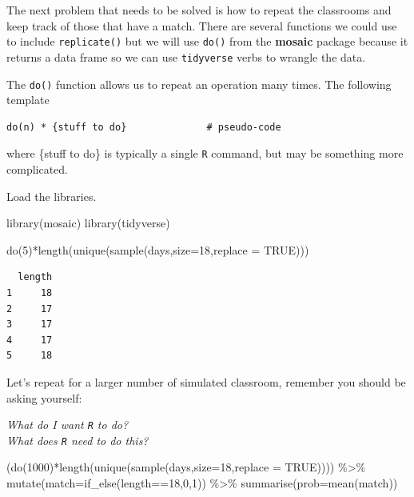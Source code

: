 \documentclass[
  letterpaper,
  DIV=11,
  numbers=noendperiod]{scrreprt}
\newenvironment{Shaded}{\begin{snugshade}}{\end{snugshade}}
\newcommand{\AttributeTok}[1]{\textcolor[rgb]{0.40,0.45,0.13}{#1}}
\newcommand{\ConstantTok}[1]{\textcolor[rgb]{0.56,0.35,0.01}{#1}}
\newcommand{\DecValTok}[1]{\textcolor[rgb]{0.68,0.00,0.00}{#1}}
\newcommand{\FunctionTok}[1]{\textcolor[rgb]{0.28,0.35,0.67}{#1}}
\newcommand{\NormalTok}[1]{\textcolor[rgb]{0.00,0.23,0.31}{#1}}
\newcommand{\SpecialCharTok}[1]{\textcolor[rgb]{0.37,0.37,0.37}{#1}}
\begin{document}
The next problem that needs to be solved is how to repeat the classrooms
and keep track of those that have a match. There are several functions
we could use to include \texttt{replicate()} but we will use
\texttt{do()} from the \textbf{mosaic} package because it returns a data
frame so we can use \texttt{tidyverse} verbs to wrangle the data.

The \texttt{do()} function allows us to repeat an operation many times.
The following template

\begin{verbatim}
do(n) * {stuff to do}              # pseudo-code
\end{verbatim}

where \{stuff to do\} is typically a single \texttt{R} command, but may
be something more complicated.

Load the libraries.

\begin{Shaded}
\begin{Highlighting}[]
\FunctionTok{library}\NormalTok{(mosaic)}
\FunctionTok{library}\NormalTok{(tidyverse)}
\end{Highlighting}
\end{Shaded}

\begin{Shaded}
\begin{Highlighting}[]
\FunctionTok{do}\NormalTok{(}\DecValTok{5}\NormalTok{)}\SpecialCharTok{*}\FunctionTok{length}\NormalTok{(}\FunctionTok{unique}\NormalTok{(}\FunctionTok{sample}\NormalTok{(days,}\AttributeTok{size=}\DecValTok{18}\NormalTok{,}\AttributeTok{replace =} \ConstantTok{TRUE}\NormalTok{)))}
\end{Highlighting}
\end{Shaded}

\begin{verbatim}
  length
1     18
2     17
3     17
4     17
5     18
\end{verbatim}

Let's repeat for a larger number of simulated classroom, remember you
should be asking yourself:

\emph{What do I want \texttt{R} to do?}\\
\emph{What does \texttt{R} need to do this?}

\begin{Shaded}
\begin{Highlighting}[]
\NormalTok{(}\FunctionTok{do}\NormalTok{(}\DecValTok{1000}\NormalTok{)}\SpecialCharTok{*}\FunctionTok{length}\NormalTok{(}\FunctionTok{unique}\NormalTok{(}\FunctionTok{sample}\NormalTok{(days,}\AttributeTok{size=}\DecValTok{18}\NormalTok{,}\AttributeTok{replace =} \ConstantTok{TRUE}\NormalTok{)))) }\SpecialCharTok{\%\textgreater{}\%}
  \FunctionTok{mutate}\NormalTok{(}\AttributeTok{match=}\FunctionTok{if\_else}\NormalTok{(length}\SpecialCharTok{==}\DecValTok{18}\NormalTok{,}\DecValTok{0}\NormalTok{,}\DecValTok{1}\NormalTok{)) }\SpecialCharTok{\%\textgreater{}\%}
  \FunctionTok{summarise}\NormalTok{(}\AttributeTok{prob=}\FunctionTok{mean}\NormalTok{(match))}
\end{Highlighting}
\end{Shaded}
\end{document}
